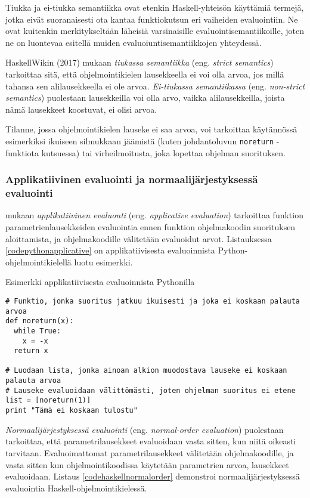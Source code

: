 Tiukka ja ei-tiukka semantiikka ovat etenkin Haskell-yhteisön käyttämiä termejä, jotka eivät suoranaisesti ota kantaa funktiokutsun eri vaiheiden evaluointiin. Ne ovat kuitenkin merkitykseltään läheisiä varsinaisille evaluointisemantiikoille, joten ne on luontevaa esitellä muiden evaluoiuntisemantiikkojen yhteydessä.

HaskellWikin (2017) mukaan \textit{tiukassa semantiikka} (eng. \textit{strict semantics}) tarkoittaa sitä, että ohjelmointikielen lausekkeella ei voi olla arvoa, jos millä tahansa sen alilausekkeella ei ole arvoa. \textit{Ei-tiukassa semantiikassa} (eng. \textit{non-strict semantics}) puolestaan lausekkeilla voi olla arvo, vaikka alilausekkeilla, joista nämä lausekkeet koostuvat, ei olisi arvoa.

Tilanne, jossa ohjelmointikielen lauseke ei saa arvoa, voi tarkoittaa käytännössä esimerkiksi ikuiseen silmukkaan jäämistä (kuten johdantoluvun \verb!noreturn! -funktiota kutsuessa) tai virheilmoitusta, joka lopettaa ohjelman suorituksen.

\subsubsection{Applikatiivinen evaluointi ja normaalijärjestyksessä evaluointi}

\citet{scott2009programming} mukaan \textit{applikatiivinen evaluonti} (eng. \textit{applicative evaluation}) tarkoittaa funktion parametrienlausekkeiden evaluointia ennen funktion ohjelmakoodin suorituksen aloittamista, ja ohjelmakoodille välitetään evaluoidut arvot. Listauksessa \ref{codepythonapplicative} on applikatiivisesta evaluoinnista Python-ohjelmointikielellä luotu esimerkki.

\begin{listing}[H]
  \caption{Esimerkki applikatiivisesta evaluoinnista Pythonilla}
  \label{codepythonapplicative}
  \bigskip
  \begin{verbatim}
# Funktio, jonka suoritus jatkuu ikuisesti ja joka ei koskaan palauta arvoa
def noreturn(x):
  while True:
    x = -x
  return x

# Luodaan lista, jonka ainoan alkion muodostava lauseke ei koskaan palauta arvoa
# Lauseke evaluoidaan välittömästi, joten ohjelman suoritus ei etene
list = [noreturn(1)]
print "Tämä ei koskaan tulostu"
  \end{verbatim}
\end{listing}

\textit{Normaalijärjestyksessä evaluointi} (eng. \textit{normal-order evaluation}) puolestaan tarkoittaa, että parametrilausekkeet evaluoidaan vasta sitten, kun niitä oikeasti tarvitaan. Evaluoimattomat parametrilausekkeet välitetään ohjelmakoodille, ja vasta sitten kun ohjelmointikoodissa käytetään parametrien arvoa, lausekkeet evaluoidaan. Listaus \ref{codehaskellnormalorder} demonstroi normaalijärjestyksessä evaluointia Haskell-ohjelmointikielessä.

